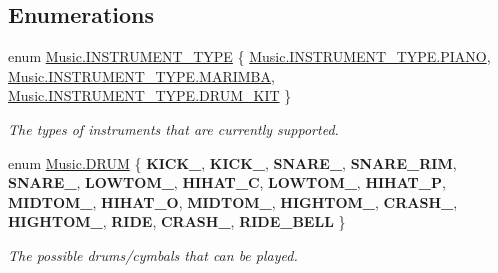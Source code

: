 \subsection*{Enumerations}
\begin{DoxyCompactItemize}
\item 
enum \hyperlink{group___enums_gabfce60192305965558a36e368ebd67c3}{Music.\+I\+N\+S\+T\+R\+U\+M\+E\+N\+T\+\_\+\+T\+Y\+PE} \{ \hyperlink{group___enums_ggabfce60192305965558a36e368ebd67c3aef6dcf375679288e8fe520ec07f29130}{Music.\+I\+N\+S\+T\+R\+U\+M\+E\+N\+T\+\_\+\+T\+Y\+P\+E.\+P\+I\+A\+NO}, 
\hyperlink{group___enums_ggabfce60192305965558a36e368ebd67c3ae84dbd9f12bf5278bfa76a692e42f50f}{Music.\+I\+N\+S\+T\+R\+U\+M\+E\+N\+T\+\_\+\+T\+Y\+P\+E.\+M\+A\+R\+I\+M\+BA}, 
\hyperlink{group___enums_ggabfce60192305965558a36e368ebd67c3aceaaf30d57fed4b1c3f4b95c60a76df6}{Music.\+I\+N\+S\+T\+R\+U\+M\+E\+N\+T\+\_\+\+T\+Y\+P\+E.\+D\+R\+U\+M\+\_\+\+K\+IT}
 \}\begin{DoxyCompactList}\small\item\em The types of instruments that are currently supported. \end{DoxyCompactList}
\item 
\mbox{\label{group___enums_gade475b4382c7066d1af13e7c13c029b6}} 
enum \hyperlink{group___enums_gade475b4382c7066d1af13e7c13c029b6}{Music.\+D\+R\+UM} \{ \newline
{\bfseries K\+I\+C\+K\+\_}, 
{\bfseries K\+I\+C\+K\+\_}, 
{\bfseries S\+N\+A\+R\+E\+\_}, 
{\bfseries S\+N\+A\+R\+E\+\_\+\+R\+IM}, 
\newline
{\bfseries S\+N\+A\+R\+E\+\_}, 
{\bfseries L\+O\+W\+T\+O\+M\+\_}, 
{\bfseries H\+I\+H\+A\+T\+\_\+C}, 
{\bfseries L\+O\+W\+T\+O\+M\+\_}, 
\newline
{\bfseries H\+I\+H\+A\+T\+\_\+P}, 
{\bfseries M\+I\+D\+T\+O\+M\+\_}, 
{\bfseries H\+I\+H\+A\+T\+\_\+O}, 
{\bfseries M\+I\+D\+T\+O\+M\+\_}, 
\newline
{\bfseries H\+I\+G\+H\+T\+O\+M\+\_}, 
{\bfseries C\+R\+A\+S\+H\+\_}, 
{\bfseries H\+I\+G\+H\+T\+O\+M\+\_}, 
{\bfseries R\+I\+DE}, 
\newline
{\bfseries C\+R\+A\+S\+H\+\_}, 
{\bfseries R\+I\+D\+E\+\_\+\+B\+E\+LL}
 \}\begin{DoxyCompactList}\small\item\em The possible drums/cymbals that can be played. \end{DoxyCompactList}
\item 

\end{DoxyCompactItemize}
